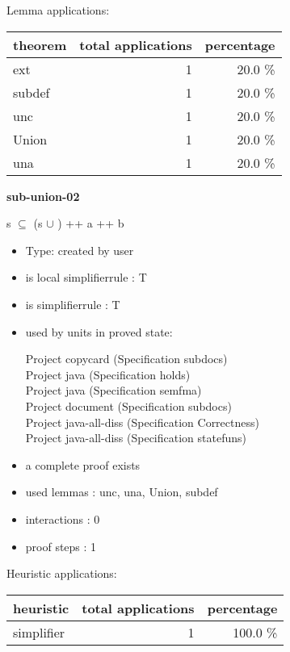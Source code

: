 \documentclass[a4paper]{article}
\begin{document}
Lemma applications:

\begin{supertabular}{l|r|r}
theorem	        & total applications & percentage \\ \hline
ext & 1 & 20.0 \% \\
subdef & 1 & 20.0 \% \\
unc & 1 & 20.0 \% \\
Union & 1 & 20.0 \% \\
una & 1 & 20.0 \% \\

\end{supertabular}
\pagebreak

{\LARGE\bf sub-union-02}\label{lemma-sub-union-02}

\medskip

 \Fol s $\subseteq$ (s $\cup$ ) ++ a ++ b

\begin{itemize}

\item Type: created by user

\item is local simplifierrule : T
\item is simplifierrule : T
\item used by units in proved state:

Project copycard (Specification subdocs) \\
Project java (Specification holds) \\
Project java (Specification semfma) \\
Project document (Specification subdocs) \\
Project java-all-diss (Specification Correctness) \\
Project java-all-diss (Specification statefuns)
\item       a complete proof exists
\item       used lemmas  : unc, una, Union, subdef
\item       interactions : 0
\item       proof steps  : 1
\end{itemize}

\medskip


Heuristic applications:

\begin{supertabular}{l|r|r}
heuristic	& total applications & percentage \\ \hline
simplifier & 1 & 100.0 \% \\

\end{supertabular}
\end{document}

